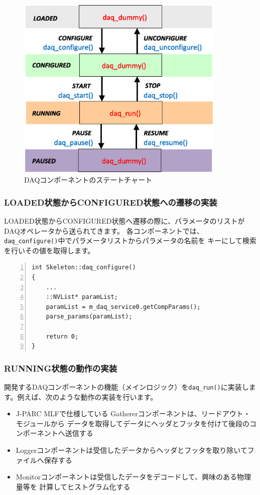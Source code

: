 \documentclass[a4j,10pt,dvips,onecolumn,oneside,final]{jarticle}%
\begin{document}
\begin{figure}[htbp]
 \begin{center}
  \includegraphics[width=100mm]{state-func.eps}
  \caption{DAQコンポーネントのステートチャート}
  \label{state-func.fig}
 \end{center}
\end{figure}

\subsubsection{LOADED状態からCONFIGURED状態への遷移の実装}\label{parse-param}
LOADED状態からCONFIGURED状態へ遷移の際に、パラメータのリストがDAQオペレータから送られてきます。
各コンポーネントでは、\verb|daq_configure()|中でパラメータリストからパラメータの名前を
キーにして検索を行いその値を取得します。
\begin{Verbatim}[tabsize=4,
    baselinestretch=0.8,
    numbers=left,
    frame=single,
    fontsize=\small,
    framesep=5pt,
    numbersep=5pt]
int Skeleton::daq_configure()
{
    ...
    ::NVList* paramList;
    paramList = m_daq_service0.getCompParams();
    parse_params(paramList);

    return 0;
}
\end{Verbatim}

\subsubsection{RUNNING状態の動作の実装}
開発するDAQコンポーネントの機能（メインロジック）を\verb|daq_run()|に実装します。例えば、次のような動作の実装を行います。
\begin{itemize}
\item J-PARC MLFで仕様している Gathererコンポーネントは、リードアウト・モジュールから
  データを取得してデータにヘッダとフッタを付けて後段のコンポーネントへ送信する
\item Loggerコンポーネントは受信したデータからヘッダとフッタを取り除いてファイルへ保存する
\item Monitorコンポーネントは受信したデータをデコードして、興味のある物理量等を
  計算してヒストグラム化する
\end{itemize}
\end{document}
